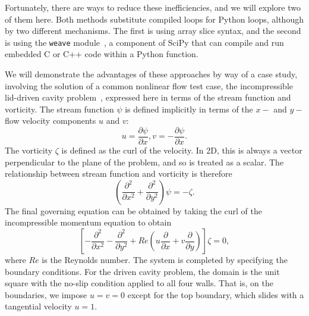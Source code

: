 \documentclass[acmtocl]{acmtrans2m}
\begin{document}
Fortunately, there are ways to reduce these inefficiencies, and we
will explore two of them here.  Both methods substitute compiled loops
for Python loops, although by two different mechanisms.  The first is
using array slice syntax, and the second is using the {\tt weave}
module~\cite{Weave-Users-Guide}, a component of SciPy that can compile
and run embedded C or C++ code within a Python function.

We will demonstrate the advantages of these approaches by way of a
case study, involving the solution of a common nonlinear flow test
case, the incompressible lid-driven cavity problem~\cite{Ghia},
expressed here in terms of the stream function and vorticity.  The
stream function $\psi$ is defined implicitly in terms of the $x-$
and $y-$ flow velocity components $u$ and $v$:
\begin{equation}
  \label{eq:velocities}
  u = \frac{\partial \psi}{\partial x}, v = -\frac{\partial
    \psi}{\partial x}.
\end{equation}
The vorticity $\zeta$ is defined as the curl of the velocity.  In 2D,
this is always a vector perpendicular to the plane of the problem, and
so is treated as a scalar.  The relationship between stream function
and vorticity is therefore
\begin{equation}
  \label{eq:streamfunction}
  \left(\frac{\partial^2}{\partial x^2} + \frac{\partial^2}{\partial
    y^2}\right) \psi = -\zeta.
\end{equation}
The final governing equation can be obtained by taking the curl of the
incompressible momentum equation to obtain
\begin{equation}
  \label{eq:vorticity}
  \left[-\frac{\partial^2}{\partial x^2} - \frac{\partial^2}{\partial
    y^2} + Re \left(u \frac{\partial}{\partial x} + v
  \frac{\partial}{\partial y} \right)\right] \zeta = 0,
\end{equation}
where $Re$ is the Reynolds number.  The system is completed by
specifying the boundary conditions.  For the driven cavity problem,
the domain is the unit square with the no-slip condition applied to
all four walls.  That is, on the boundaries, we impose $u=v=0$ except
for the top boundary, which slides with a tangential velocity $u=1$.
\end{document}
